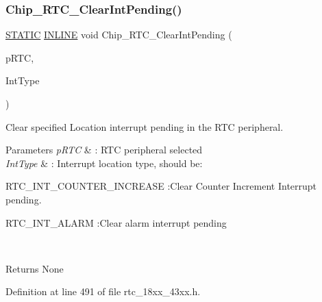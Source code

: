 \subsubsection{\texorpdfstring{Chip\+\_\+\+R\+T\+C\+\_\+\+Clear\+Int\+Pending()}{Chip\_RTC\_ClearIntPending()}}
{\footnotesize\ttfamily \hyperlink{group___l_p_c___types___public___macros_ga10b2d890d871e1489bb02b7e70d9bdfb}{S\+T\+A\+T\+IC} \hyperlink{spifi__18xx__43xx_8h_a2eb6f9e0395b47b8d5e3eeae4fe0c116}{I\+N\+L\+I\+NE} void Chip\+\_\+\+R\+T\+C\+\_\+\+Clear\+Int\+Pending (\begin{DoxyParamCaption}\item[{\hyperlink{struct_l_p_c___r_t_c___t}{L\+P\+C\+\_\+\+R\+T\+C\+\_\+T} $\ast$}]{p\+R\+TC,  }\item[{uint32\+\_\+t}]{Int\+Type }\end{DoxyParamCaption})}



Clear specified Location interrupt pending in the R\+TC peripheral. 


\begin{DoxyParams}{Parameters}
{\em p\+R\+TC} & \+: R\+TC peripheral selected \\
\hline
{\em Int\+Type} & \+: Interrupt location type, should be\+:
\begin{DoxyItemize}
\item R\+T\+C\+\_\+\+I\+N\+T\+\_\+\+C\+O\+U\+N\+T\+E\+R\+\_\+\+I\+N\+C\+R\+E\+A\+SE \+:Clear Counter Increment Interrupt pending.
\item R\+T\+C\+\_\+\+I\+N\+T\+\_\+\+A\+L\+A\+RM \+:Clear alarm interrupt pending 
\end{DoxyItemize}\\
\hline
\end{DoxyParams}
\begin{DoxyReturn}{Returns}
None 
\end{DoxyReturn}


Definition at line 491 of file rtc\+\_\+18xx\+\_\+43xx.\+h.

\mbox{\label{group___r_t_c__18_x_x__43_x_x_gaddaf7559a23df0704358128234fcb214}} 
